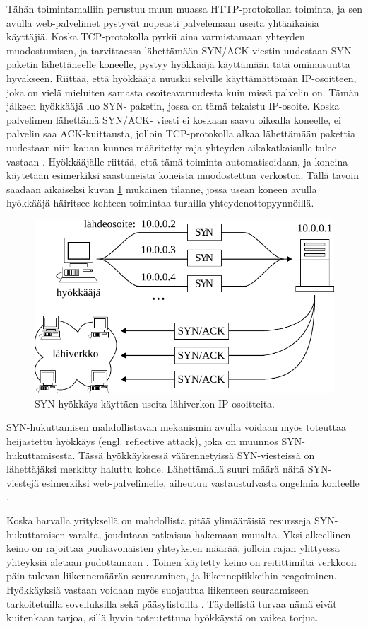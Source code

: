 Tähän toimintamalliin perustuu muun muassa HTTP-protokollan toiminta, ja sen avulla 
web-palvelimet pystyvät nopeasti palvelemaan useita yhtäaikaisia käyttäjiä.
Koska TCP-protokolla pyrkii aina varmistamaan yhteyden muodostumisen, ja tarvittaessa 
lähettämään SYN/ACK-viestin uudestaan SYN-paketin lähettäneelle koneelle, pystyy hyökkääjä
käyttämään tätä ominaisuutta hyväkseen. Riittää, että hyökkääjä nuuskii
selville käyttämättömän IP-osoitteen, joka on vielä mieluiten samasta
osoiteavaruudesta kuin missä palvelin on. Tämän jälkeen hyökkääjä luo SYN-
paketin, jossa on tämä tekaistu IP-osoite. Koska palvelimen lähettämä SYN/ACK-
viesti ei koskaan saavu oikealla koneelle, ei palvelin saa ACK-kuittausta,
jolloin TCP-protokolla alkaa lähettämään pakettia uudestaan niin kauan kunnes
määritetty raja yhteyden aikakatkaisulle tulee vastaan \cite{STACK}. Hyökkääjälle
riittää, että tämä toiminta automatisoidaan, ja koneina käytetään esimerkiksi
saastuneista koneista muodostettua verkostoa. Tällä tavoin saadaan aikaiseksi
kuvan \ref{syn} mukainen tilanne, jossa usean koneen avulla hyökkääjä häiritsee
kohteen toimintaa turhilla yhteydenottopyynnöillä.

\begin{figure}[hpt]
\centering
\includegraphics[width=12cm]{pics/syn.pdf}
\caption{SYN-hyökkäys käyttäen useita lähiverkon IP-osoitteita.}
\label{syn}
\end{figure}

SYN-hukuttamisen mahdollistavan mekanismin avulla voidaan myös toteuttaa
heijastettu hyökkäys (engl. reflective attack), joka on muunnos 
SYN-hukuttamisesta. Tässä hyökkäyksessä väärennetyissä SYN-viesteissä on
lähettäjäksi merkitty haluttu kohde. Lähettämällä suuri määrä näitä SYN-viestejä 
esimerkiksi web-palvelimelle, aiheutuu vastaustulvasta ongelmia
kohteelle \cite{STACK}.

Koska harvalla yrityksellä on mahdollista pitää ylimääräisiä resursseja SYN-
hukuttamisen varalta, joudutaan ratkaisua hakemaan muualta. Yksi
alkeellinen keino on rajoittaa puoliavonaisten yhteyksien määrää, jolloin rajan
ylittyessä yhteyksiä aletaan pudottamaan \cite{TCP}. Toinen käytetty keino on
reitittimiltä verkkoon päin tulevan liikennemäärän seuraaminen, ja
liikennepiikkeihin reagoiminen. Hyökkäyksiä vastaan voidaan myös suojautua
liikenteen seuraamiseen tarkoitetuilla sovelluksilla sekä pääsylistoilla \cite{STACK}.
Täydellistä turvaa nämä eivät kuitenkaan tarjoa, sillä hyvin toteutettuna
hyökkäystä on vaikea torjua.

